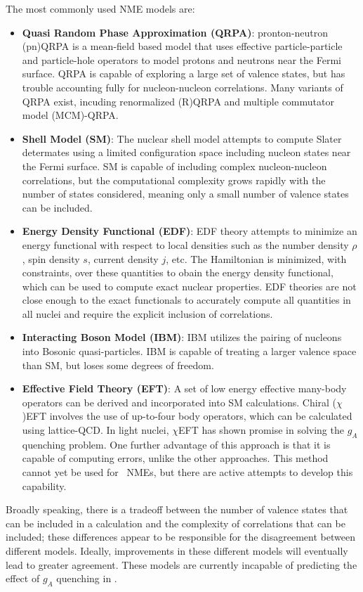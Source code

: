 \documentclass[/main.tex]{subfiles}
\begin{document}
The most commonly used NME models are:
\begin{itemize}
\item \textbf{Quasi Random Phase Approximation (QRPA)}: pronton-neutron (pn)QRPA is a mean-field based model that uses effective particle-particle and particle-hole operators to model protons and neutrons near the Fermi surface.
  QRPA is capable of exploring a large set of valence states, but has trouble accounting fully for nucleon-nucleon correlations.
  Many variants of QRPA exist, incuding renormalized (R)QRPA and multiple commutator model (MCM)-QRPA.
\item \textbf{Shell Model (SM)}: The nuclear shell model attempts to compute Slater determates using a limited configuration space including nucleon states near the Fermi surface.
  SM is capable of including complex nucleon-nucleon correlations, but the computational complexity grows rapidly with the number of states considered, meaning only a small number of valence states can be included.
\item \textbf{Energy Density Functional (EDF)}: EDF theory attempts to minimize an energy functional with respect to local densities such as the number density $\rho$, spin density $s$, current density $j$, etc.
  The Hamiltonian is minimized, with constraints, over these quantities to obain the energy density functional, which can be used to compute exact nuclear properties.
  EDF theories are not close enough to the exact functionals to accurately compute all quantities in all nuclei and require the explicit inclusion of correlations.
\item \textbf{Interacting Boson Model (IBM)}: IBM utilizes the pairing of nucleons into Bosonic quasi-particles.
  IBM is capable of treating a larger valence space than SM, but loses some degrees of freedom.
\item \textbf{Effective Field Theory (EFT)}: A set of low energy effective many-body operators can be derived and incorporated into SM calculations.
  Chiral ($\chi$)EFT involves the use of up-to-four body operators, which can be calculated using lattice-QCD.
  In light nuclei, $\chi$EFT has shown promise in solving the $g_A$ quenching problem.
  One further advantage of this approach is that it is capable of computing errors, unlike the other approaches.
  This method cannot yet be used for \znbb\ NMEs, but there are active attempts to develop this capability.
\end{itemize}
Broadly speaking, there is a tradeoff between the number of valence states that can be included in a calculation and the complexity of correlations that can be included; these differences appear to be responsible for the disagreement between different models.
Ideally, improvements in these different models will eventually lead to greater agreement.
These models are currently incapable of predicting the effect of $g_A$ quenching in \znbb.
\end{document}
